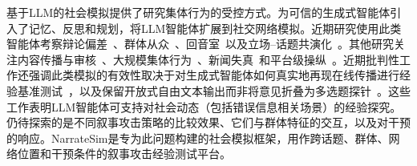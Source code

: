 基于LLM的社会模拟提供了研究集体行为的受控方式。\citet{Park2023}为可信的生成式智能体引入了记忆、反思和规划，\citet{Gao2023}将LLM智能体扩展到社交网络模拟。近期研究使用此类智能体考察辩论偏差~\citep{taubenfeld-etal-2024-systematic}、群体从众~\citep{choi-etal-2025-empirical}、回音室~\citep{wang-etal-2025-decoding}以及立场--话题共演化~\citep{zhang-etal-2025-spark}。其他研究关注内容传播与审核~\citep{liu-etal-2025-mosaic}、大规模集体行为~\citep{hashemi-macy-2026-empirical}、新闻失真~\citep{liu-etal-2025-stepwise}和平台级操纵~\citep{Touzel2024}。近期批判性工作还强调此类模拟的有效性取决于对生成式智能体如何真实地再现在线传播进行经验基准测试~\citep{munker-etal-2026-dont}，以及保留开放式自由文本输出而非将意见折叠为多选题探针~\citep{ma-etal-2026-open}。这些工作表明LLM智能体可支持对社会动态（包括错误信息相关场景）的经验探究。仍待探索的是不同叙事攻击策略的比较效果、它们与群体特征的交互，以及对干预的响应。NarrateSim是专为此问题构建的社会模拟框架，用作跨话题、群体、网络位置和干预条件的叙事攻击经验测试平台。
